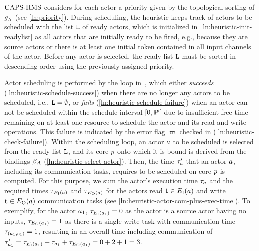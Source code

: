 $\textup{{CAPS-HMS}}$ considers for each actor a priority given by the topological sorting of $g_{\tilde{\textrm{A}}}$ (see \cref{ln:priority}).
During scheduling, the heuristic keeps track of actors to be scheduled with the list $\mathtt{L}$ of ready actors, which is initialized in~\cref{ln:heuristic-init-readylist} as all actors that are initially ready to be fired, e.g., because they are source actors or there is at least one initial token contained in all input channels of the actor.
Before any actor is selected, the ready list $\mathtt{L}$ must be sorted in descending order using the previously assigned priority.
\par
Actor scheduling is performed by the loop in~, which either \emph{succeeds} (\cref{ln:heuristic-schedule-success}) when there are no longer any actors to be scheduled, i.e., $\mathtt{L} = \emptyset$, or \emph{fails} (\cref{ln:heuristic-schedule-failure}) when an actor can not be scheduled within the schedule interval $[0, \mathbf{P}[$ due to insufficient free time remaining on at least one resource to schedule the actor and its read and write operations.
This failure is indicated by the error flag $\varpi$ checked in (\cref{ln:heuristic-check-failure}).
Within the scheduling loop, an actor $a$ to be scheduled is selected from the ready list $\mathtt{L}$, and its core $p$ onto which it is bound is derived from the bindings $\beta_A$ (\cref{ln:heuristic-select-actor}).
Then, the time $\tau'_a$ that an actor $a$, including its communication tasks, requires to be scheduled on core $p$ is computed.
For this purpose, we sum the actor’s execution time $\tau_{a}$ and the required times $\tau_{E_\textrm{I}(a)}$ and $\tau_{E_\textrm{O}(a)}$ for the actors read $\mathbf{t} \in E_\textrm{I}(a)$ and write $\mathbf{t} \in E_\textrm{O}(a)$ communication tasks (see \cref{ln:heuristic-actor-com-plus-exec-time}).
To exemplify, for the actor $a_1$, $\tau_{E_\textrm{I}(a_1)} = 0$ as the actor is a source actor having no inputs, $\tau_{E_\textrm{O}(a_1)} = 1$ as there is a single write task with communication time $\tau_{(a_1,c_1)} = 1$, resulting in an overall time including communication of $\tau'_{a_1} = \tau_{E_\textrm{I}(a_1)} + \tau_{a_1} + \tau_{E_\textrm{O}(a_1)} = 0 + 2 + 1 = 3$.
